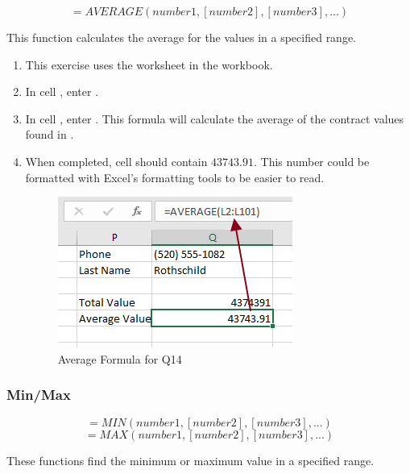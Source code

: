 \[ =AVERAGE(number1, [number2], [number3], ...) \]

This function calculates the average for the values in a specified range. 

\begin{enumbox}
	\begin{enumerate}
		\item This exercise uses the  worksheet in the  workbook.
		\item In cell , enter .
		\item In cell , enter . This formula will calculate the average of the contract values found in .
		\item When completed, cell  should contain $ 43743.91 $. This number could be formatted with Excel's formatting tools to be easier to read.
	
		\begin{figure}[H]
			\centering
			\includegraphics[width=\maxwidth{.75\linewidth}]{gfx/ch09_fig39}
			\caption{Average Formula for Q14}
			\label{09:fig39}
		\end{figure}
	
	\end{enumerate}
\end{enumbox}
	
\subsubsection{Min/Max}

\[ =MIN(number1, [number2], [number3], ...) \]
\[ =MAX(number1, [number2], [number3], ...) \]

These functions find the minimum or maximum value in a specified range. 

